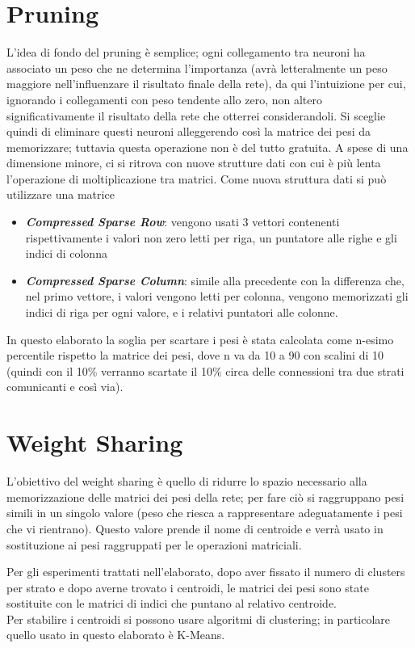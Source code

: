 \documentclass[12pt]{report}
\begin{document}
\section{Pruning}

L’idea di fondo del pruning è semplice; ogni collegamento tra neuroni ha associato un peso che ne determina l’importanza (avrà letteralmente un peso maggiore nell’influenzare il risultato finale della rete), da qui l’intuizione per cui, ignorando i collegamenti con peso tendente allo zero, non altero significativamente il risultato della rete che otterrei considerandoli. 
Si sceglie quindi di eliminare questi neuroni alleggerendo così la matrice dei pesi da memorizzare; tuttavia questa operazione non è del tutto gratuita. A spese di una dimensione minore, ci si ritrova con nuove strutture dati con cui è più lenta l'operazione di moltiplicazione tra matrici. Come nuova struttura dati si può utilizzare una matrice
\begin{itemize}
\item{\textbf{\textit{Compressed Sparse Row}}}: vengono usati 3 vettori contenenti rispettivamente i valori non zero letti per riga, un puntatore alle righe e gli indici di colonna
\item{\textbf{\textit{Compressed Sparse Column}}}: simile alla precedente con la differenza che, nel primo vettore, i valori vengono letti per colonna, vengono memorizzati gli indici di riga per ogni valore, e i relativi puntatori alle colonne.
\end{itemize}


In questo elaborato la soglia per scartare i pesi è stata calcolata come n-esimo percentile rispetto la matrice dei pesi, dove n va da 10 a 90 con scalini di 10 (quindi con il 10\% verranno scartate il 10\% circa delle connessioni tra due strati comunicanti e così via).

\section{Weight Sharing}

L’obiettivo del weight sharing è quello di ridurre lo spazio necessario alla memorizzazione delle matrici dei pesi della rete; per fare ciò si raggruppano pesi simili in un singolo valore (peso che riesca a rappresentare adeguatamente i pesi che vi rientrano). Questo valore prende il nome di centroide e verrà usato in sostituzione ai pesi raggruppati per le operazioni matriciali. 

Per gli esperimenti trattati nell'elaborato, dopo aver fissato il numero di clusters per strato e dopo averne trovato i centroidi, le matrici dei pesi sono state sostituite con le matrici di indici che puntano al relativo centroide. \\
Per stabilire i centroidi si possono usare algoritmi di clustering; in particolare quello usato in questo elaborato è K-Means. 
\end{document}
